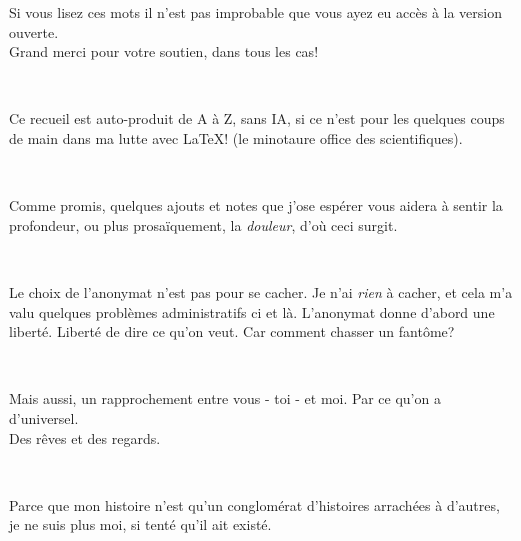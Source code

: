 \begin{center}
    \vspace*{\fill}
    \begin{minipage}{0.8\linewidth}

    \centering
    Si vous lisez ces mots il n'est pas improbable
    que vous ayez eu accès à la version ouverte.
    \\
    Grand merci pour votre soutien, dans tous les cas!

    ~\par
    
    Ce recueil est auto-produit de A à Z,
    sans IA, si ce n'est pour les quelques coups
    de main dans ma lutte avec \LaTeX{}!
    (le \og{}minotaure office\fg{} des scientifiques).

    ~\par

    Comme promis, quelques ajouts et notes que j'ose
    espérer vous aidera à sentir la profondeur, ou plus
    prosaïquement, la \textit{douleur}, d'où ceci surgit.
    
    ~\par

    Le choix de l'anonymat n'est pas pour se cacher.
    Je n'ai \textit{rien} à cacher, et cela m'a valu
    quelques problèmes administratifs ci et là.
    L'anonymat donne d'abord une liberté.
    Liberté de dire ce qu'on veut.
    Car comment chasser un fantôme?
        
    ~\par

    Mais aussi, un rapprochement entre vous - toi - et moi.
    Par ce qu'on a d'universel.\\
    
    Des rêves et des regards.
        
    ~\par

    Parce que mon histoire n'est qu'un conglomérat
    d'histoires arrachées à d'autres, je ne suis plus moi,
    si tenté qu'il ait existé.
    
    \end{minipage}
    \vspace*{\fill}
\end{center}
\or
